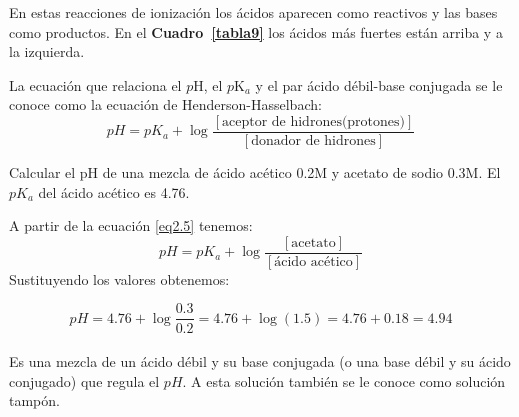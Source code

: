 En estas reacciones de ionizaci\'on los \'acidos aparecen como reactivos y las bases como productos.
 En el \textbf{Cuadro~\ref{tabla9}} los \'acidos m\'as fuertes est\'an arriba y a la izquierda.

La ecuaci\'on que relaciona el $p$H, el $p$K$_a$  y el par
\'acido d\'ebil-base conjugada se le conoce como la ecuaci\'on de
Henderson-Hasselbach:
\begin{equation}
pH = pK_a + \log
\frac{[\textrm{aceptor de hidrones(protones)}]}
{[\textrm{donador de hidrones}]}
\label{eq2.5}
\end{equation}

\begin{example}
 Calcular el pH de una mezcla de \'acido ac\'etico 0.2M y acetato de sodio 0.3M. El $pK_a$ del \'acido ac\'etico es 4.76.

A partir de la ecuaci\'on \ref{eq2.5} tenemos:
$$ pH = pK_a + \log \frac{[\textrm{acetato}]}{{[\textrm{
\'acido ac\'etico}]}}$$ Sustituyendo los valores obtenemos:

$$pH = 4.76 + \log \frac{0.3}{0.2} = 4.76 + \log(1.5) = 4.76 +
0.18=4.94$$
\end{example}

\paragraph{}Es una mezcla de un \'acido d\'ebil y su base conjugada (o una base d\'e\-bil y su \'acido conjugado) que regula el $pH$. A esta soluci\'on tambi\'en se le conoce como soluci\'on tamp\'on.

